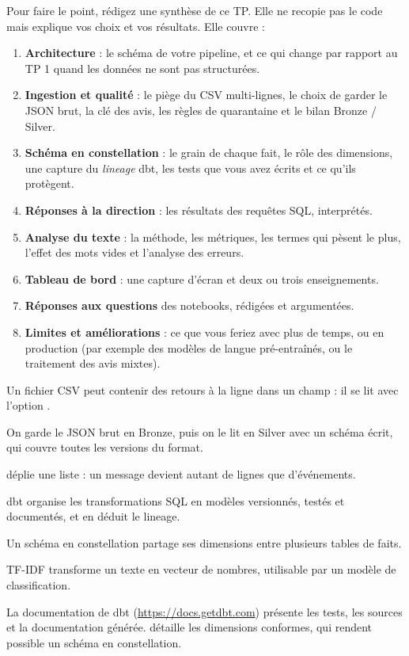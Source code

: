 Pour faire le point, rédigez une synthèse de ce TP. Elle ne recopie pas le code mais explique
vos choix et vos résultats. Elle couvre :
\begin{enumerate}[leftmargin=*,itemsep=2pt]
  \item \textbf{Architecture} : le schéma de votre pipeline, et ce qui change par rapport au TP 1
        quand les données ne sont pas structurées.
  \item \textbf{Ingestion et qualité} : le piège du CSV multi-lignes, le choix de garder le JSON brut,
        la clé des avis, les règles de quarantaine et le bilan Bronze / Silver.
  \item \textbf{Schéma en constellation} : le grain de chaque fait, le rôle des dimensions, une capture du
        \emph{lineage} dbt, les tests que vous avez écrits et ce qu'ils protègent.
  \item \textbf{Réponses à la direction} : les résultats des requêtes SQL, interprétés.
  \item \textbf{Analyse du texte} : la méthode, les métriques, les termes qui pèsent le plus, l'effet
        des mots vides et l'analyse des erreurs.
  \item \textbf{Tableau de bord} : une capture d'écran et deux ou trois enseignements.
  \item \textbf{Réponses aux questions} des notebooks, rédigées et argumentées.
  \item \textbf{Limites et améliorations} : ce que vous feriez avec plus de temps, ou en production
        (par exemple des modèles de langue pré-entraînés, ou le traitement des avis mixtes).
\end{enumerate}

\begin{aretenir}
  \item Un fichier CSV peut contenir des retours à la ligne dans un champ : il se lit avec l'option .
  \item On garde le JSON brut en Bronze, puis on le lit en Silver avec un schéma écrit, qui couvre toutes les versions du format.
  \item {} déplie une liste : un message devient autant de lignes que d'événements.
  \item dbt organise les transformations SQL en modèles versionnés, testés et documentés, et en déduit le lineage.
  \item Un schéma en constellation partage ses dimensions entre plusieurs tables de faits.
  \item TF-IDF transforme un texte en vecteur de nombres, utilisable par un modèle de classification.
\end{aretenir}

\begin{plusloin}
La documentation de dbt (\url{https://docs.getdbt.com}) présente les tests, les sources et la documentation générée. \citet{kimball2013} détaille les dimensions conformes, qui rendent possible un schéma en constellation.
\end{plusloin}

